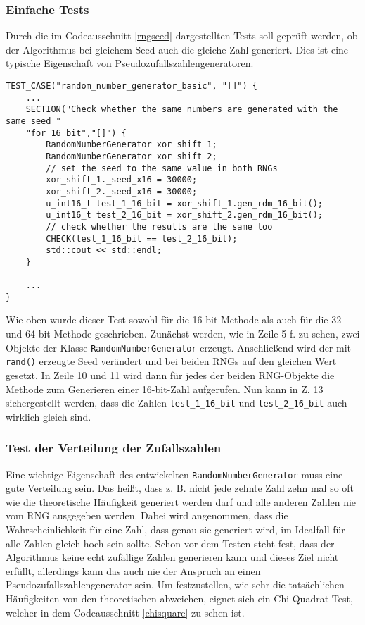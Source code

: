 \documentclass[../review_3.tex]{subfiles}
\begin{document}
\subsubsection{Einfache Tests}

Durch die im Codeausschnitt \ref{rngseed} dargestellten Tests soll geprüft werden, ob der Algorithmus bei gleichem Seed auch die gleiche Zahl generiert. Dies ist eine typische Eigenschaft von Pseudozufallszahlengeneratoren.

\begin{lstlisting}[caption= {Test der Gleichheit der generierten Zahlen bei zwei RNGs mit gleichem Seed}, label = rngseed]
TEST_CASE("random_number_generator_basic", "[]") {
    ...
    SECTION("Check whether the same numbers are generated with the same seed "
    "for 16 bit","[]") {
        RandomNumberGenerator xor_shift_1;
        RandomNumberGenerator xor_shift_2;
        // set the seed to the same value in both RNGs
        xor_shift_1._seed_x16 = 30000;
        xor_shift_2._seed_x16 = 30000;
        u_int16_t test_1_16_bit = xor_shift_1.gen_rdm_16_bit();
        u_int16_t test_2_16_bit = xor_shift_2.gen_rdm_16_bit();
        // check whether the results are the same too
        CHECK(test_1_16_bit == test_2_16_bit);
        std::cout << std::endl;
    }
    
    ...
}\end{lstlisting}

Wie oben wurde dieser Test sowohl für die 16-bit-Methode als auch für die 32- und 64-bit-Methode geschrieben. Zunächst werden, wie in Zeile 5 f. zu sehen, zwei Objekte der Klasse \texttt{RandomNumberGenerator} erzeugt. Anschließend wird der mit \texttt{rand()} erzeugte Seed verändert und bei beiden RNGs auf den gleichen Wert gesetzt. In Zeile 10 und 11 wird dann für jedes der beiden RNG-Objekte die Methode zum Generieren einer 16-bit-Zahl aufgerufen. Nun kann in Z. 13 sichergestellt werden, dass die Zahlen \texttt{test\_1\_16\_bit} und \texttt{test\_2\_16\_bit} auch wirklich gleich sind.

\subsubsection{Test der Verteilung der Zufallszahlen}
Eine wichtige Eigenschaft des entwickelten \texttt{RandomNumberGenerator} muss eine gute Verteilung sein. Das heißt, dass z. B. nicht jede zehnte Zahl zehn mal so oft wie die theoretische Häufigkeit generiert werden darf und alle anderen Zahlen nie vom RNG ausgegeben werden. Dabei wird angenommen, dass die Wahrscheinlichkeit für eine Zahl, dass genau sie generiert wird, im Idealfall für alle Zahlen gleich hoch sein sollte. Schon vor dem Testen steht fest, dass der Algorithmus keine echt zufällige Zahlen generieren kann und dieses Ziel nicht erfüllt, allerdings kann das auch nie der Anspruch an einen Pseudozufallszahlengenerator sein.
Um festzustellen, wie sehr die tatsächlichen Häufigkeiten von den theoretischen abweichen, eignet sich ein Chi-Quadrat-Test, welcher in dem Codeausschnitt \ref{chisquare} zu sehen ist.
\end{document}
